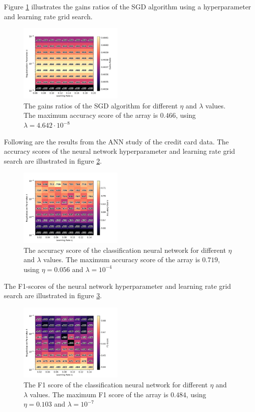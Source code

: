 		Figure \ref{fig:SGDgs} illustrates the gains ratios of the SGD algorithm using a hyperparameter and learning rate grid search.
		\begin{figure}[H]
			\centering
			\includegraphics[width=0.45\textwidth]{figures/SGD_gains.pdf}
			\caption{The gains ratios of the SGD algorithm for different $\eta$ and $\lambda$ values. The maximum accuracy score of the array is $0.466$, using $\lambda=4.642\cdot 10^{-8}$}
			\label{fig:SGDgs}
		\end{figure}
		Following are the results from the ANN study of the credit card data. The accuracy scores of the neural network hyperparameter and learning rate grid search are illustrated in figure \ref{fig:cc_acc}.
		\begin{figure}[H]
			\centering
			\includegraphics[width=0.45\textwidth]{figures/cc_res_0.pdf}
			\caption{The accuracy score of the classification neural network for different $\eta$ and $\lambda$ values. The maximum accuracy score of the array is $0.719$, using $\eta=0.056$ and $\lambda=10^{-4}$}
			\label{fig:cc_acc}
		\end{figure}
		The F1-scores of the neural network hyperparameter and learning rate grid search are illustrated in figure \ref{fig:cc_F1}.
		\begin{figure}[H]
			\centering
			\includegraphics[width=0.45\textwidth]{figures/cc_res_1.pdf}
			\caption{The F1 score of the classification neural network for different $\eta$ and $\lambda$ values. The maximum F1 score of the array is $0.484$, using $\eta=0.103$ and $\lambda=10^{-7}$}
			\label{fig:cc_F1}
		\end{figure}
